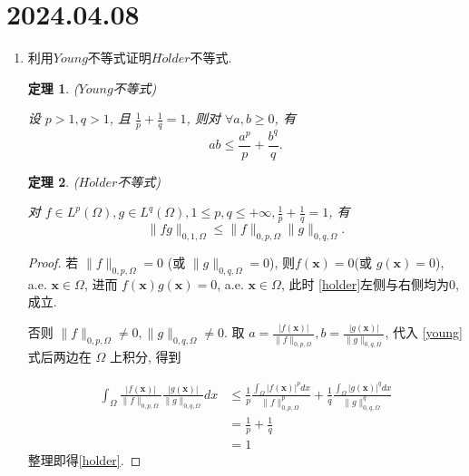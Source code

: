 \documentclass[12pt,a4paper]{article}
\newtheorem{theorem}{定理}
\begin{document}
	
	\noindent
	
	\section*{2024.04.08}	
	
	
	\begin{enumerate}
		\item 利用$Young$不等式证明$H\ddot{o}lder$不等式.
		
		\begin{theorem}{($Young$不等式)}
			
			设 $p>1, q>1$, 且 $\frac{1}{p}+\frac{1}{q}=1$, 则对 $\forall a, b \geq 0$, 有
			\begin{equation} 
				a b \leq \frac{a^p}{p}+\frac{b^q}{q} .\label{young}
			\end{equation}
		\end{theorem}
		
		\begin{theorem}{($H\ddot{o}lder$不等式)}
			
			对 $f \in L^p(\Omega), g \in L^q(\Omega), 1 \leqslant p, q \leqslant+\infty, \frac{1}{p}+\frac{1}{q}=1$, 有
			\begin{equation}
				\|f g\|_{0,1, \Omega} \leqslant\|f\|_{0, p, \Omega}\|g\|_{0, q, \Omega} .\label{holder}
			\end{equation}
			
			
		\end{theorem}
		
		\begin{proof}
			
			若 $\|f\|_{0, p, \Omega}=0$ (或 $\|g\|_{0, q, \Omega}=0$), 则$f(\boldsymbol{x}) = 0$(或 $g(\boldsymbol{x})=0$), a.e. $\boldsymbol{x} \in \Omega$, 进而 $f(\boldsymbol{x}) g(\boldsymbol{x})=0$, a.e. $\boldsymbol{x} \in \Omega$, 此时 \eqref{holder}左侧与右侧均为0, 成立.
			
			否则 $\|f\|_{0, p, \Omega} \neq 0,\|g\|_{0, q, \Omega} \neq 0$. 取 $a=\frac{|f(\boldsymbol{x})|}{\|f\|_{0, p, \Omega}}, b=\frac{|g(\boldsymbol{x})|}{\|g\|_{0, q, \Omega}}$, 代入 \eqref{young}式后两边在 $\Omega$ 上积分, 得到 
			
			\begin{equation*}
				\begin{aligned}
					\int_{\Omega}\frac{|f(\boldsymbol{x})|}{\|f\|_{0, p, \Omega}}\frac{|g(\boldsymbol{x})|}{\|g\|_{0, q, \Omega}} dx &\leq \frac{1}{p} \frac{\int_{\Omega}|f(\boldsymbol{x})|^p dx}{\|f\|_{0, p, \Omega}^p} + \frac{1}{q} \frac{\int_{\Omega}|g(\boldsymbol{x})|^q dx}{\|g\|_{0, q, \Omega}^q}\\
					& = \frac{1}{p}+\frac{1}{q}\\
					& = 1
				\end{aligned} 
			\end{equation*}
			整理即得\eqref{holder}.
			

\end{proof}
\end{enumerate}
\end{document}
